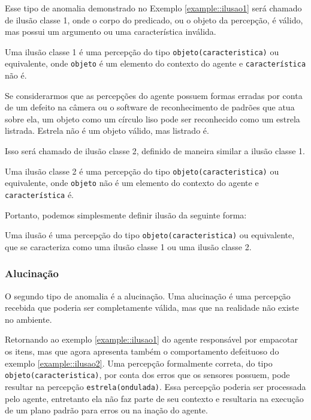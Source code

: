 Esse tipo de anomalia demonstrado no Exemplo \ref{example::ilusao1} será chamado de ilusão classe 1, onde o corpo do predicado, ou o objeto da percepção, é válido, mas possui um argumento ou uma característica inválida.

\begin{definition}{}
   Uma ilusão classe 1 é uma percepção do tipo \texttt{objeto(caracteristica)} ou equivalente, onde \texttt{objeto} é um elemento do contexto do agente e \texttt{característica} não é.
\end{definition}

\begin{example}
    Se considerarmos que as percepções do agente possuem formas erradas por conta de um defeito na câmera ou o software de reconhecimento de padrões que atua sobre ela, um objeto como um círculo liso pode ser reconhecido como um estrela listrada. Estrela não é um objeto válido, mas listrado é.
    \label{example::ilusao2}
\end{example}{}

Isso será chamado de ilusão classe 2, definido de maneira similar a ilusão classe 1.

\begin{definition}{}
   Uma ilusão classe 2 é uma percepção do tipo \texttt{objeto(caracteristica)} ou equivalente, onde \texttt{objeto} não é um elemento do contexto do agente e \texttt{característica} é.
\end{definition}

Portanto, podemos simplesmente definir ilusão da seguinte forma:

\begin{definition}{}
   Uma ilusão é uma percepção do tipo \texttt{objeto(caracteristica)} ou equivalente, que se caracteriza como uma ilusão classe 1 ou uma ilusão classe 2.
\end{definition}

\subsubsection{Alucinação}

O segundo tipo de anomalia é a alucinação. Uma alucinação é uma percepção recebida que poderia ser completamente válida, mas que na realidade não existe no ambiente.

\begin{example} {}
    Retornando ao exemplo \ref{example::ilusao1} do agente responsável por empacotar os itens, mas que agora apresenta também o comportamento defeituoso do exemplo \ref{example::ilusao2}. Uma percepção formalmente correta, do tipo \texttt{objeto(caracteristica)}, por conta dos erros que os sensores possuem, pode resultar na percepção \texttt{estrela(ondulada)}. Essa percepção poderia ser processada pelo agente, entretanto ela não faz parte de seu contexto e resultaria na execução de um plano padrão para erros ou na inação do agente.
    \label{exemple::alucinacao}
\end{example}

